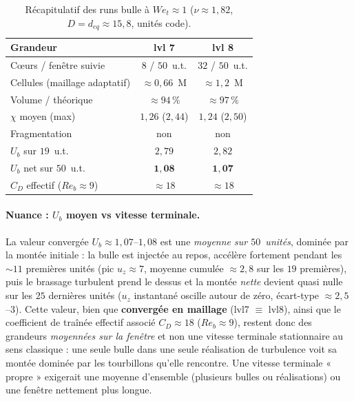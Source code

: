 \begin{table}[H]
    \centering
    \caption{Récapitulatif des runs bulle à $We_t \approx 1$
    ($\nu \approx 1{,}82$, $D = d_{eq} \approx 15{,}8$, unités code).}
    \label{tab:bulle_we1}
    \begin{tabular}{@{}lcc@{}}
        \toprule
        \textbf{Grandeur} & \textbf{lvl 7} & \textbf{lvl 8} \\
        \midrule
        Cœurs / fenêtre suivie             & $8$ / $50$~u.t. & $32$ / $50$~u.t. \\
        Cellules (maillage adaptatif)      & $\approx 0{,}66$~M & $\approx 1{,}2$~M \\
        Volume / théorique                 & $\approx 94\,\%$ & $\approx 97\,\%$ \\
        $\chi$ moyen (max)                 & $1{,}26$ ($2{,}44$) & $1{,}24$ ($2{,}50$) \\
        Fragmentation                      & non & non \\ \midrule
        $U_b$ sur $19$~u.t.                & $2{,}79$ & $2{,}82$ \\
        $U_b$ net sur $50$~u.t.            & $\mathbf{1{,}08}$ & $\mathbf{1{,}07}$ \\
        $C_D$ effectif ($Re_b \approx 9$)  & $\approx 18$ & $\approx 18$ \\
        \bottomrule
    \end{tabular}
\end{table}

\paragraph{Nuance : $U_b$ moyen vs vitesse terminale.} La valeur convergée
$U_b \approx 1{,}07$--$1{,}08$ est une \emph{moyenne sur $50$~unités}, dominée par
la montée initiale : la bulle est injectée au repos, accélère fortement pendant les
$\sim 11$ premières unités (pic $u_z \approx 7$, moyenne cumulée $\approx 2{,}8$ sur
les $19$ premières), puis le brassage turbulent prend le dessus et la montée
\emph{nette} devient quasi nulle sur les $25$ dernières unités ($u_z$ instantané
oscille autour de zéro, écart-type $\approx 2{,}5$--$3$). Cette valeur, bien que
\textbf{convergée en maillage} (lvl7 $\equiv$ lvl8), ainsi que le coefficient de
traînée effectif associé $C_D \approx 18$ ($Re_b \approx 9$), restent donc des
grandeurs \emph{moyennées sur la fenêtre} et non une vitesse terminale stationnaire
au sens classique : une seule bulle dans une seule réalisation de turbulence voit sa
montée dominée par les tourbillons qu'elle rencontre. Une vitesse terminale
« propre » exigerait une moyenne d'ensemble (plusieurs bulles ou réalisations) ou
une fenêtre nettement plus longue.

